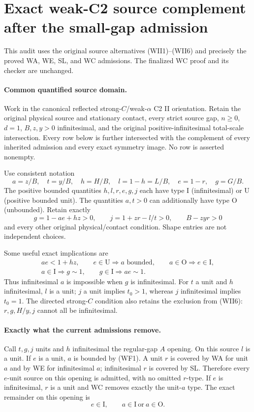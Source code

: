 \section{Exact weak-C2 source complement after the small-gap admission}
\label{sec:r13-weak-frontier}

This audit uses the original source alternatives (WII1)--(WII6)
and precisely the proved WA, WE, SL, and WC admissions.
The finalized WC proof and its checker are unchanged.

\paragraph{Common quantified source domain.}
Work in the canonical reflected strong-$C$/weak-$\alpha$ C2 II
orientation. Retain the original physical source and stationary
contact, every strict source gap, $n\ge0$, $d=1$,
$B,z,y>0$ infinitesimal, and the original positive-infinitesimal
total-scale intersection. Every row below is further intersected
with the complement of every inherited admission and every exact
symmetry image. No row is asserted nonempty.

Use consistent notation
\[
 a=z/B,\quad t=y/B,\quad h=H/B,\quad l=1-h=L/B,\quad
 e=1-r,\quad g=G/B.
\]
The positive bounded quantities $h,l,r,e,g,j$ each have type
$\mathrm I$ (infinitesimal) or $\mathrm U$ (positive bounded unit).
The quantities $a,t>0$ can additionally have type
$\mathrm O$ (unbounded). Retain exactly
\[
 g=1-ae+hz>0,\qquad j=1+zr-l/t>0,\qquad B-zyr>0
\]
and every other original physical/contact condition. Shape entries
are not independent choices.

Some useful exact implications are
\[
 \begin{gathered}
 ae<1+hz,\qquad e\in\mathrm U\Longrightarrow a\text{ bounded},
 \qquad a\in\mathrm O\Longrightarrow e\in\mathrm I,\\
 a\in\mathrm I\Longrightarrow g\sim1,\qquad
 g\in\mathrm I\Longrightarrow ae\sim1.
 \end{gathered}                                                \tag{WF1}
\]
Thus infinitesimal $a$ is impossible when $g$ is infinitesimal.
For $t$ a unit and $h$ infinitesimal, $l$ is a unit; $j$ a unit
implies $t_0>1$, whereas $j$ infinitesimal implies $t_0=1$.
The directed strong-$C$ condition also retains the exclusion from
(WII6): $r,g,H/y,j$ cannot all be infinitesimal.

\paragraph{Exactly what the current admissions remove.}
Call $t,g,j$ units and $h$ infinitesimal the regular-gap $A$ opening.
On this source $l$ is a unit. If $e$ is a unit, $a$ is bounded by
(WF1). A unit $r$ is covered by WA for unit $a$ and by WE for
infinitesimal $a$; infinitesimal $r$ is covered by SL. Therefore
every $e$-unit source on this opening is admitted, with no omitted
$r$-type. If $e$ is infinitesimal, $r$ is a unit and WC removes
exactly the unit-$a$ type. The exact remainder on this opening is
\[
 \boxed{\quad e\in\mathrm I,\qquad
             a\in\mathrm I\ \text{or}\ a\in\mathrm O.\quad}      \tag{WF2}
\]

